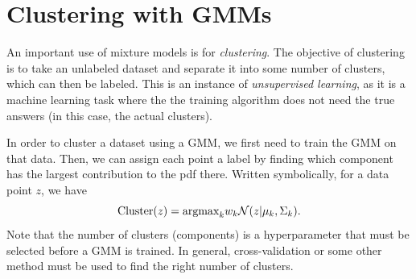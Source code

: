 
\section*{Clustering with GMMs}

An important use of mixture models is for \emph{clustering}.
The objective of clustering is to take an unlabeled dataset and separate it into some number of clusters, which can then be labeled.
This is an instance of \emph{unsupervised learning}, as it is a machine learning task where the the training algorithm does not need the true answers (in this case, the actual clusters).

In order to cluster a dataset using a GMM, we first need to train the GMM on that data.
Then, we can assign each point a label by finding which component has the largest contribution to the pdf there.
Written symbolically, for a data point \(z\), we have
\[
\mathrm{Cluster}(z)=\mbox{argmax}_k w_k \mathcal{N}(z|\mu_k, \Sigma_k).
\]
Note that the number of clusters (components) is a hyperparameter that must be selected before a GMM is trained.
In general, cross-validation or some other method must be used to find the right number of clusters.


